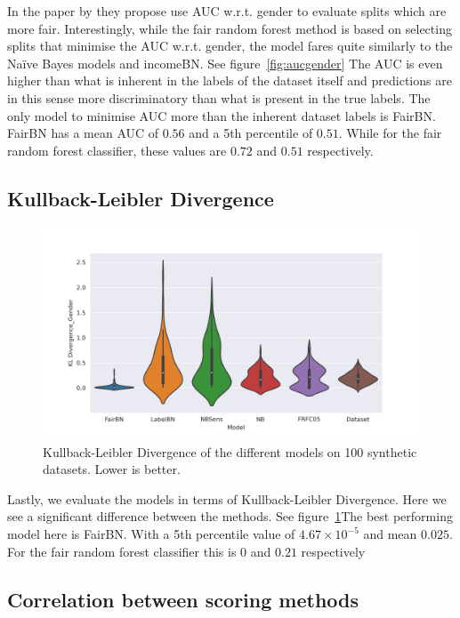 In the paper by \citet{Antonio:2021:arXiv} they propose use AUC w.r.t. gender to evaluate splits which are more fair. Interestingly, while the fair random forest method is based on selecting splits that minimise the AUC w.r.t. gender, the model fares quite similarly to the Naïve Bayes models and incomeBN. See figure~\ref{fig:aucgender} The AUC is even higher than what is inherent in the labels of the dataset itself and predictions are in this sense more discriminatory than what is present in the true labels. The only model to minimise AUC more than the inherent dataset labels is FairBN. FairBN has a mean AUC of $0.56$ and a 5th percentile of $0.51$. While for the fair random forest classifier, these values are $0.72$ and $0.51$ respectively.

\subsection{Kullback-Leibler Divergence}

\begin{figure}
    \centering
    \includegraphics[width=\linewidth]{figures/kldg-synthetic.png}
    \caption{Kullback-Leibler Divergence of the different models on 100 synthetic datasets. Lower is better.}
    \label{fig:kldg-synthetic}
\end{figure}

Lastly, we evaluate the models in terms of Kullback-Leibler Divergence. Here we see a significant difference between the methods. See figure~\ref{fig:kldg-synthetic}The best performing model here is FairBN. With a 5th percentile value of $4.67 \times 10^{-5}$ and mean $0.025$. For the fair random forest classifier this is $0$ and $0.21$ respectively

\subsection{Correlation between scoring methods}

